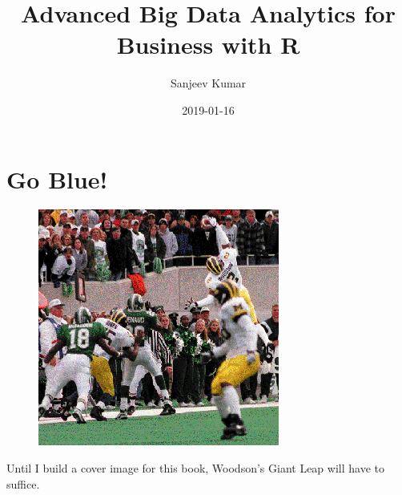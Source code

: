 \documentclass[]{krantz}
\title{Advanced Big Data Analytics for Business with R}
\author{Sanjeev Kumar}
\date{2019-01-16}
\renewenvironment{quote}{\begin{VF}}{\end{VF}}
\begin{document}
\maketitle


\thispagestyle{empty}

\begin{center}

\par{}

\end{center}

\setlength{\abovedisplayskip}{-5pt}
\setlength{\abovedisplayshortskip}{-5pt}

{
\hypersetup{linkcolor=black}
\setcounter{tocdepth}{2}
\tableofcontents
}
\listoftables
\listoffigures
\chapter*{Go Blue!}\label{go-blue}


\begin{figure}
\centering
\includegraphics{images/woodson.png}
\caption{}
\end{figure}

\begin{quote}
Until I build a cover image for this book, Woodson's Giant Leap will
have to suffice.
\end{quote}
\end{document}

